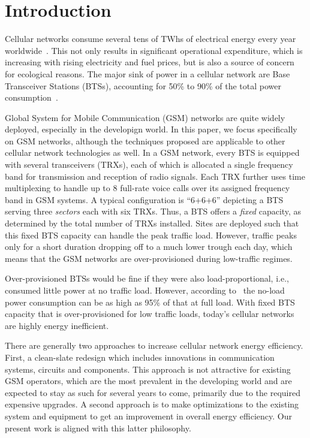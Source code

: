 \section{Introduction}
\label{sec:intro} 
Cellular networks consume several tens of TWhs of electrical energy
every year worldwide~\cite{Oh:Comm:2011}. This not only results
in significant operational expenditure, which is increasing with
rising electricity and fuel prices, but is also a source of concern
for ecological reasons. The major sink of power in a cellular network are Base
Transceiver Stations (BTSs), accounting for 50\% to 90\% of
the total power
consumption~\cite{Louhi:2007:BTSPower:INTELEC,Oh:Comm:2011}.

Global System for Mobile Communication (GSM) networks are quite widely deployed, especially in the developign world. In this paper, we focus specifically on GSM networks, although the techniques proposed are applicable to other cellular network technologies as well. In a GSM network, every BTS is equipped with several transceivers (TRXs), each of
which is allocated a single frequency band for transmission and
reception of radio signals. Each TRX further uses time
multiplexing to handle up to 8 full-rate voice calls over its
assigned frequency band in GSM systems. A typical configuration
is ``6+6+6'' depicting a BTS serving three \textit{sectors}
each with six TRXs. Thus, a BTS offers a \textit{fixed} capacity, as
determined by the total number of TRXs installed. Sites are
deployed such that this fixed BTS capacity can handle the peak
traffic load. However, traffic peaks only for a short duration
dropping off to a much lower trough each day, which means that
the GSM networks are over-provisioned during
low-traffic regimes.

Over-provisioned BTSs would be fine if they were also
load-proportional, i.e., consumed little power at no traffic
load. However, according to~\cite{Peng:2011:BTSSaving:Mobicom}
the no-load power consumption can be as high as 95\% of that at
full load. With fixed BTS capacity that is over-provisioned for
low traffic loads, today's cellular networks are highly energy inefficient.

There are generally two approaches to increase cellular network
energy efficiency. First, a clean-slate redesign which includes
innovations in communication systems, circuits and components.
This approach is not attractive for existing GSM operators,
which are the most prevalent in the developing world and are
expected to stay as such for several years to come, primarily due to the required expensive upgrades. 
A second approach is to make optimizations to the existing system
and equipment to get an improvement in overall energy
efficiency. Our present work is aligned with this latter
philosophy.

